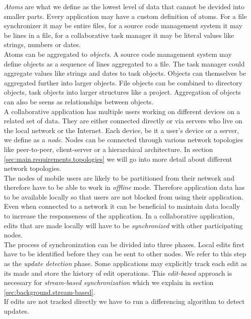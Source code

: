 \emph{Atoms} are what we define as the lowest level of data that cannot be devided into smaller parts.
Every application may have a custom definition of atoms.
For a file synchronizer it may be entire files, for a source code management system it may be lines in a file, for a collaborative task manager it may be literal values like strings, numbers or dates.\\
Atoms can be aggregated to \emph{objects}.
A source code management system may define objects as a sequence of lines aggregated to a file.
The task manager could aggregate values like strings and dates to task objects.
Objects can themselves be aggregated further into larger objects.
File objects can be combined to directory objects, task objects into larger structures like a project.
Aggregation of objects can also be seens as relationships between objects.\\
A collaborative application has multiple users working on different devices on a related set of data.
They are either connected directly or via servers who live on the local network or the Internet.
Each device, be it a user's device or a server, we define as a \emph{node}.
Nodes can be connected through various network topologies like peer-to-peer, client-server or a hierarchical architecture.
In section \ref{sec:main.requirements.topologies} we will go into more detail about different network topologies.\\
The nodes of mobile users are likely to be partitioned from their network and therefore have to be able to work in \emph{offline} mode.
Therefore application data has to be available locally so that users are not blocked from using their application.
Even when connected to a network it can be beneficial to maintain data locally to increase the responseness of the application.
In a collaborative application, edits that are made locally will have to be \emph{synchronized} with other participating nodes.\\
The process of synchronization can be divided into three phases.
Local edits first have to be identified before they can be sent to other nodes.
We refer to this step as the \emph{update detection} phase.
Some applications may explicitly track each edit as its made and store the history of edit operations.
This \emph{edit-based} approach is necessary for \emph{stream-based synchronization} which we explain in section \ref{sec:background.stream-based}.\\
If edits are not tracked directly we have to run a differencing algorithm to detect updates.
